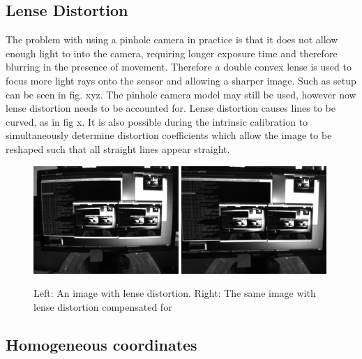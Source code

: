 
\subsection{Lense Distortion}


The problem with using a pinhole camera in practice is that it does not allow enough light to into the camera, requiring longer exposure time and therefore blurring in the presence of movement. Therefore a double convex lense is used to focus more light rays onto the sensor and allowing a sharper image.  Such as setup can be seen in fig. xyz.  The pinhole camera model may still be used, however now lense distortion needs to be accounted for.  Lense distortion causes lines to be curved, as in fig x.  It is also possible during the intrinsic calibration to simultaneously determine distortion coefficients which allow the image to be reshaped such that all straight lines appear straight.

\begin{figure}[h!]
  \centering
    \includegraphics[width=0.49\textwidth]{chapters/images/distorted}
    \includegraphics[width=0.49\textwidth]{chapters/images/undistorted}
  \caption{Left: An image with lense distortion.  Right: The same image with lense distortion
compensated for}
\end{figure}

\subsection{Homogeneous coordinates}

